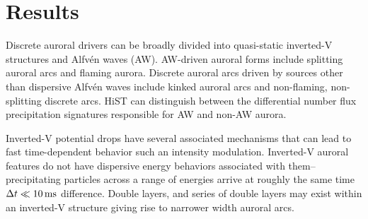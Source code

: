 \section{Results}\label{sec:fusana}

Discrete auroral drivers can be broadly divided into quasi-static inverted-V structures and Alfvén waves (AW).
AW-driven auroral forms include splitting auroral arcs and flaming aurora.
Discrete auroral arcs driven by sources other than dispersive Alfvén waves include kinked auroral arcs and non-flaming, non-splitting discrete arcs.
HiST can distinguish between the differential number flux precipitation signatures responsible for AW and non-AW aurora.

Inverted-V potential drops have several associated mechanisms that can lead to fast time-dependent behavior such an intensity modulation.
Inverted-V auroral features do not have dispersive energy behaviors associated with them--precipitating particles across a range of energies arrive at roughly the same time $\Delta t \ll \unit[10]{ms}$ difference.
Double layers, and series of double layers may exist within an inverted-V structure giving rise to narrower width auroral arcs.

